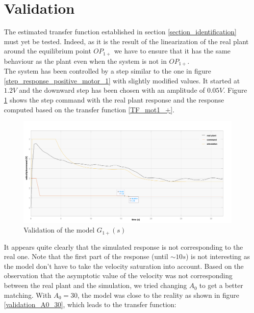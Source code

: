 \section{Validation}
\label{section_validation}

The estimated transfer function established in section \ref{section_identification} must yet be tested. Indeed, as it
is the result of the linearization of the real plant around the equilibrium point $OP_{1+}$ we have to ensure that it
has the same behaviour as the plant even when the system is not in $OP_{1+}$.\\

The system has been controlled by a step similar to the one in figure \ref{step_response_positive_motor_1} with slightly
modified values. It started at $1.2 V$ and the downward step has been chosen with an amplitude of $0.05 V$. Figure 
\ref{validation_A0_24} shows the step command with the real plant response and the response computed based on the
transfer function \ref{TF_mot1_+}.

\begin{figure}[H]
    \centering
    \includegraphics[height=\textheight/3]{Pictures/validation_A0_24.png}
    \caption{Validation of the model $G_{1+} (s)$}
    \label{validation_A0_24}
\end{figure}

It appears quite clearly that the simulated response is not corresponding to the real one. Note that the first part of
the response (until $\sim 10s$) is not interesting as the model don't have to take the velocity saturation into account.
Based on the observation that the asymptotic value of the velocity was not corresponding between the real plant and the
simulation, we tried changing $A_0$ to get a better matching. With $A_0 = 30$, the model was close to the reality as 
shown in figure \ref{validation_A0_30}, which leads to the transfer function:

